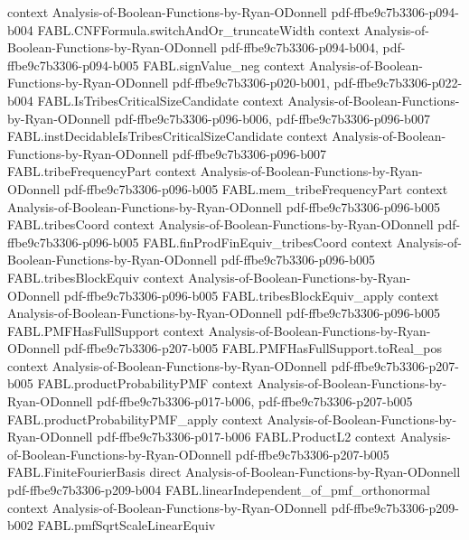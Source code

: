 \begin{theorem}
  {context}
  {Analysis-of-Boolean-Functions-by-Ryan-ODonnell}
  {pdf-ffbe9c7b3306-p094-b004}
\proofstep
  {FABL.CNFFormula.switchAndOr_truncateWidth}
  {context}
  {Analysis-of-Boolean-Functions-by-Ryan-ODonnell}
  {pdf-ffbe9c7b3306-p094-b004,
    pdf-ffbe9c7b3306-p094-b005}
\proofstep
  {FABL.signValue_neg}
  {context}
  {Analysis-of-Boolean-Functions-by-Ryan-ODonnell}
  {pdf-ffbe9c7b3306-p020-b001,
    pdf-ffbe9c7b3306-p022-b004}
\proofstep
  {FABL.IsTribesCriticalSizeCandidate}
  {context}
  {Analysis-of-Boolean-Functions-by-Ryan-ODonnell}
  {pdf-ffbe9c7b3306-p096-b006,
    pdf-ffbe9c7b3306-p096-b007}
\proofstep
  {FABL.instDecidableIsTribesCriticalSizeCandidate}
  {context}
  {Analysis-of-Boolean-Functions-by-Ryan-ODonnell}
  {pdf-ffbe9c7b3306-p096-b007}
\proofstep
  {FABL.tribeFrequencyPart}
  {context}
  {Analysis-of-Boolean-Functions-by-Ryan-ODonnell}
  {pdf-ffbe9c7b3306-p096-b005}
\proofstep
  {FABL.mem_tribeFrequencyPart}
  {context}
  {Analysis-of-Boolean-Functions-by-Ryan-ODonnell}
  {pdf-ffbe9c7b3306-p096-b005}
\proofstep
  {FABL.tribesCoord}
  {context}
  {Analysis-of-Boolean-Functions-by-Ryan-ODonnell}
  {pdf-ffbe9c7b3306-p096-b005}
\proofstep
  {FABL.finProdFinEquiv_tribesCoord}
  {context}
  {Analysis-of-Boolean-Functions-by-Ryan-ODonnell}
  {pdf-ffbe9c7b3306-p096-b005}
\proofstep
  {FABL.tribesBlockEquiv}
  {context}
  {Analysis-of-Boolean-Functions-by-Ryan-ODonnell}
  {pdf-ffbe9c7b3306-p096-b005}
\proofstep
  {FABL.tribesBlockEquiv_apply}
  {context}
  {Analysis-of-Boolean-Functions-by-Ryan-ODonnell}
  {pdf-ffbe9c7b3306-p096-b005}
\proofstep
  {FABL.PMFHasFullSupport}
  {context}
  {Analysis-of-Boolean-Functions-by-Ryan-ODonnell}
  {pdf-ffbe9c7b3306-p207-b005}
\proofstep
  {FABL.PMFHasFullSupport.toReal_pos}
  {context}
  {Analysis-of-Boolean-Functions-by-Ryan-ODonnell}
  {pdf-ffbe9c7b3306-p207-b005}
\proofstep
  {FABL.productProbabilityPMF}
  {context}
  {Analysis-of-Boolean-Functions-by-Ryan-ODonnell}
  {pdf-ffbe9c7b3306-p017-b006,
    pdf-ffbe9c7b3306-p207-b005}
\proofstep
  {FABL.productProbabilityPMF_apply}
  {context}
  {Analysis-of-Boolean-Functions-by-Ryan-ODonnell}
  {pdf-ffbe9c7b3306-p017-b006}
\proofstep
  {FABL.ProductL2}
  {context}
  {Analysis-of-Boolean-Functions-by-Ryan-ODonnell}
  {pdf-ffbe9c7b3306-p207-b005}
\proofstep
  {FABL.FiniteFourierBasis}
  {direct}
  {Analysis-of-Boolean-Functions-by-Ryan-ODonnell}
  {pdf-ffbe9c7b3306-p209-b004}
\proofstep
  {FABL.linearIndependent_of_pmf_orthonormal}
  {context}
  {Analysis-of-Boolean-Functions-by-Ryan-ODonnell}
  {pdf-ffbe9c7b3306-p209-b002}
\proofstep
  {FABL.pmfSqrtScaleLinearEquiv}

\end{theorem}
